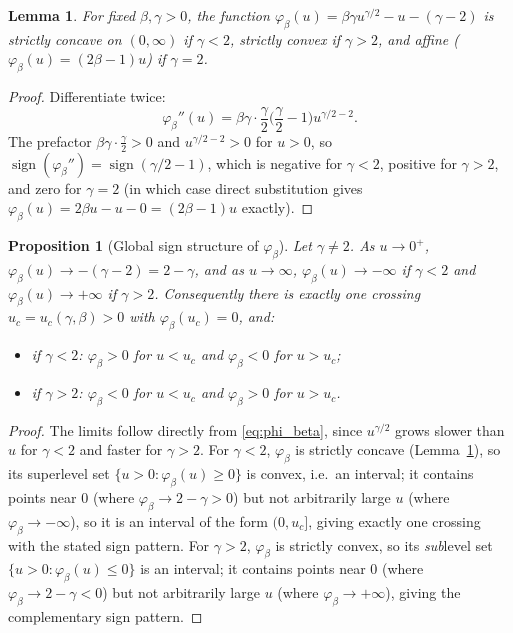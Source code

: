 \documentclass[11pt,a4paper]{article}
\theoremstyle{plain}
\newtheorem{proposition}[theorem]{Proposition}
\newtheorem{lemma}[theorem]{Lemma}
\theoremstyle{definition}
\theoremstyle{remark}
\newcommand{\bw}{\beta}
\newcommand{\phib}{\varphi_{\bw}}
\begin{document}
\begin{lemma}
\label{lem:convexity}
For fixed $\bw,\gamma>0$, the function $\phib(u)=\bw\gamma u^{\gamma/2}-u-(\gamma-2)$
is strictly concave on $(0,\infty)$ if $\gamma<2$, strictly convex if
$\gamma>2$, and affine ($\phib(u)=(2\bw-1)u$) if $\gamma=2$.
\end{lemma}
\begin{proof}
Differentiate twice:
\[
  \phib''(u)=\bw\gamma\cdot\frac{\gamma}{2}\Big(\frac{\gamma}{2}-1\Big)u^{\gamma/2-2}.
\]
The prefactor $\bw\gamma\cdot\frac{\gamma}{2}>0$ and $u^{\gamma/2-2}>0$ for
$u>0$, so $\operatorname{sign}(\phib'')=\operatorname{sign}(\gamma/2-1)$,
which is negative for $\gamma<2$, positive for $\gamma>2$, and zero for
$\gamma=2$ (in which case direct substitution gives
$\phib(u)=2\bw u-u-0=(2\bw-1)u$ exactly).
\end{proof}

\begin{proposition}[Global sign structure of $\phib$]
\label{prop:global_sign}
Let $\gamma\ne2$. As $u\to0^+$, $\phib(u)\to-(\gamma-2)=2-\gamma$, and as
$u\to\infty$, $\phib(u)\to-\infty$ if $\gamma<2$ and $\phib(u)\to+\infty$ if
$\gamma>2$. Consequently there is exactly one crossing $u_c=u_c(\gamma,\bw)>0$
with $\phib(u_c)=0$, and:
\begin{itemize}[leftmargin=1.4em]
\item if $\gamma<2$: $\phib>0$ for $u<u_c$ and $\phib<0$ for $u>u_c$;
\item if $\gamma>2$: $\phib<0$ for $u<u_c$ and $\phib>0$ for $u>u_c$.
\end{itemize}
\end{proposition}
\begin{proof}
The limits follow directly from \eqref{eq:phi_beta}, since $u^{\gamma/2}$
grows slower than $u$ for $\gamma<2$ and faster for $\gamma>2$. For
$\gamma<2$, $\phib$ is strictly concave (Lemma~\ref{lem:convexity}), so its
superlevel set $\{u>0:\phib(u)\ge0\}$ is convex, i.e.\ an interval; it
contains points near $0$ (where $\phib\to2-\gamma>0$) but not arbitrarily
large $u$ (where $\phib\to-\infty$), so it is an interval of the form
$(0,u_c]$, giving exactly one crossing with the stated sign pattern. For
$\gamma>2$, $\phib$ is strictly convex, so its \emph{sub}level set
$\{u>0:\phib(u)\le0\}$ is an interval; it contains points near $0$ (where
$\phib\to2-\gamma<0$) but not arbitrarily large $u$ (where
$\phib\to+\infty$), giving the complementary sign pattern.
\end{proof}
\end{document}

